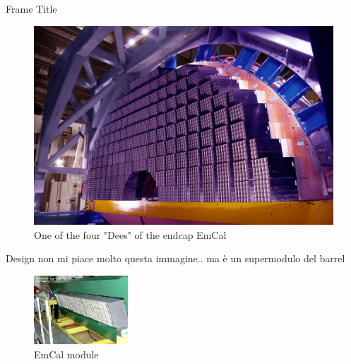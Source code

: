 \documentclass[10pt]{beamer}
\begin{document}
\begin{frame}{Frame Title}
    \begin{figure}
        \centering
        \includegraphics[width=.85\textwidth]{./img/ecal_endcap_photo.jpg}
        \caption{One of the four "Dees" of the endcap EmCal }
        \label{fig:ecal_dees}
    \end{figure}
\end{frame}

\begin{frame}{Design}
    non mi piace molto questa immagine.. ma è un supermodulo del barrel
    \begin{figure}
        \centering
        \includegraphics[width=100pt]{./img/emcal_module.png}
        \caption{EmCal module}
        \label{fig:emcalModule}
    \end{figure}
\end{frame}
\end{document}
